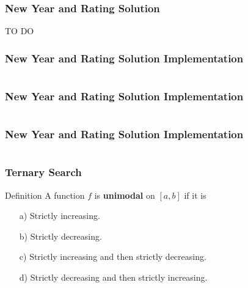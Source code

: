 \documentclass{beamer}
\begin{document}
\ifanswers

\begin{frame}%
\frametitle{New Year and Rating Solution}

TO DO

\end{frame}

\begin{frame}[containsverbatim]
\frametitle{New Year and Rating Solution Implementation}
\scriptsize

\begin{lstlisting}[mathescape]
\end{lstlisting}

\end{frame}

\begin{frame}[containsverbatim]
\frametitle{New Year and Rating Solution Implementation}
\scriptsize

\begin{lstlisting}[mathescape]
\end{lstlisting}

\end{frame}

\begin{frame}[containsverbatim]
\frametitle{New Year and Rating Solution Implementation}
\scriptsize

\begin{lstlisting}[mathescape]
\end{lstlisting}

\end{frame}



\begin{frame}%
\frametitle{Ternary Search}


\footnotesize

\begin{block}{Definition}
A function $f$ is \textbf{unimodal} on $[a, b]$ if it is
\begin{itemize}
\item[a)] Strictly increasing.
\item[b)] Strictly decreasing.
\item[c)] Strictly increasing and then strictly decreasing.
\item[d)] Strictly decreasing and then strictly increasing.
\end{itemize}
\end{block}


\end{frame}
\end{document}
